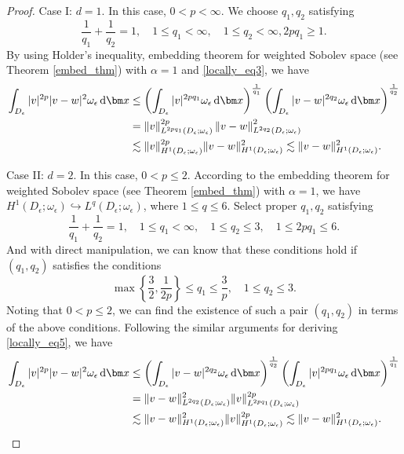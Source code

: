 \documentclass[3p,times]{elsarticle}
\numberwithin{equation}{section}
\newcommand{\dd}{\,{\rm d}}
\begin{document}
\begin{proof}
	Case I: $d=1$. In this case, $0<p<\infty$. We choose $q_1,q_2$ satisfying
	\begin{equation*}
		\frac{1}{q_1}+\frac{1}{q_2}=1,\quad 1\leq q_1<\infty,\quad 1\leq q_2<\infty, 2pq_1\geq 1.
	\end{equation*}
	By using Holder's inequality, embedding theorem for weighted Sobolev space (see Theorem \ref{embed_thm}) with $\alpha = 1$ and \eqref{locally_eq3}, we have
	\begin{equation}
		\begin{aligned}
			\label{locally_eq5}
			\int_{D_{\epsilon}}|v|^{2p}|v-w|^2\omega_{\epsilon}\dd\bm x &\leq\left(\int_{D_{\epsilon}}|v|^{2pq_1}\omega_{\epsilon}\dd\bm x\right)^{\frac{1}{q_1}}\left(\int_{D_{\epsilon}}|v-w|^{2q_2}\omega_{\epsilon}\dd\bm x\right)^{\frac{1}{q_2}}\\
			&=\left\|v\right\|_{L^{2pq_1}(D_{\epsilon};\omega_{\epsilon})}^{2p}\left\|v-w\right\|_{L^{2q_2}(D_{\epsilon};\omega_{\epsilon})}^2\\
			&\lesssim \|v\|_{H^1(D_{\epsilon};\omega_{\epsilon})}^{2p}\|v-w\|_{H^1(D_{\epsilon};\omega_{\epsilon})}^2\lesssim \|v-w\|_{H^1(D_{\epsilon};\omega_{\epsilon})}^2.
		\end{aligned}
	\end{equation}
	
	Case II: $d=2$. In this case, $0<p\leq 2$. According to the embedding theorem for weighted Sobolev space (see Theorem \ref{embed_thm}) with $\alpha=1$, we have $H^1(D_{\epsilon};\omega_{\epsilon})\hookrightarrow L^q(D_{\epsilon};\omega_{\epsilon})$, where $1\leq q\leq 6$. Select proper $q_1,q_2$ satisfying
	\begin{equation*}
		\frac{1}{q_1}+\frac{1}{q_2}=1,\quad 1\leq q_1<\infty,\quad 1\leq q_2\leq 3, \quad 1\leq 2pq_1\leq 6.
	\end{equation*}
	And with direct manipulation, we can know that these conditions hold if $(q_1,q_2)$ satisfies the conditions
	\begin{equation*}
		\max\left\{\frac 3 2,\frac{1}{2p} \right\}\leq q_1\leq \frac{3}{p},\quad 1 \leq q_2\leq 3.
	\end{equation*}
	Noting that $0<p\leq 2$, we can find the existence of such a pair $(q_1,q_2)$ in terms of the above conditions. Following the similar arguments for deriving \eqref{locally_eq5}, we have
	\begin{equation}
		\label{locally_eq6}
		\begin{aligned}
			\int_{D_{\epsilon}} |v|^{2p}|v-w|^2\omega_{\epsilon}\dd\bm x&\leq \left(\int_{D_{\epsilon}}|v-w|^{2q_2}\omega_{\epsilon}\dd\bm x\right)^{\frac{1}{q_2}}\left(\int_{D_{\epsilon}}|v|^{2pq_1}\omega_{\epsilon}\dd\bm x\right)^{\frac{1}{q_1}}\\
			&=\|v-w\|_{L^{2q_2}(D_{\epsilon};\omega_{\epsilon})}^2\|v\|_{L^{2pq_1}(D_{\epsilon};\omega_{\epsilon})}^{2p}\\
			&\lesssim\|v-w\|_{H^1(D_{\epsilon};\omega_{\epsilon})}^2\|v\|_{H^1(D_{\epsilon};\omega_{\epsilon})}^{2p}\lesssim \|v-w\|_{H^1(D_{\epsilon};\omega_{\epsilon})}^2.
		\end{aligned}
	\end{equation}
	

\end{proof}
\end{document}
